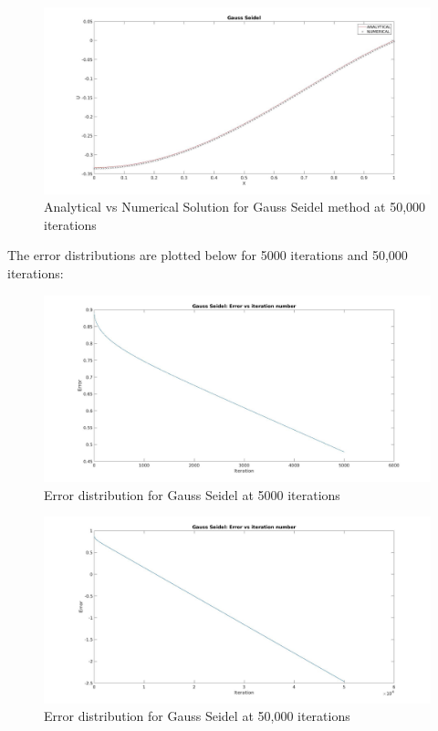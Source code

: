 \documentclass{article}
\begin{document}
	\begin{figure}[H]
	\includegraphics[width=\linewidth]{GS_50k.jpg}
	
	
	\caption{Analytical vs Numerical Solution for Gauss Seidel method at 50,000 iterations}
	\end{figure}


	The error distributions are plotted below for 5000 iterations and 50,000 iterations: 
	
	\begin{figure}[H]
		\includegraphics[width=\linewidth]{GS_error.jpg}	
		
		\caption{Error distribution for Gauss Seidel at 5000 iterations}
	\end{figure}


	\begin{figure}[H]
		\includegraphics[width=\linewidth]{GS_error_50k.jpg}	
		
		\caption{Error distribution for Gauss Seidel at 50,000 iterations}
	\end{figure}
\end{document}
